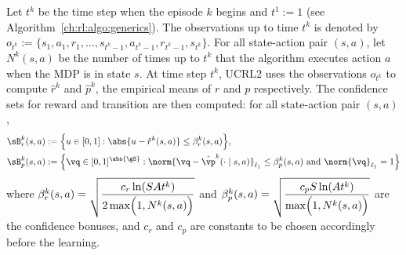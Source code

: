 Let $t^k$ be the time step when the episode $k$ begins and $t^1:=1$ (see Algorithm~\ref{ch:rl:algo:generics}).
The observations up to time $t^k$ is denoted by $o_{t^k}{:=}\{s_1,a_1,r_1,\dots,s_{t^k-1},a_{t^k-1},r_{t^k-1},s_{t^k}\}$.
For all state-action pair $(s,a)$, let $N^k(s,a)$ be the number of times up to $t^k$ that the algorithm executes action $a$ when the MDP is in state $s$.
At time step $t^k$, UCRL2 uses the observations $o_{t^k}$ to compute $\hat{r}^k$ and $\hat{p}^k$, the empirical means of $r$ and $p$ respectively.
The confidence sets for reward and transition are then computed: for all state-action pair $(s,a)$,
\begin{align*}
    \sB_r^k(s,a)&:=\Bigl\{u\in[0,1] : \abs{u-\hat{r}^k(s,a)}\le\beta^k_r(s,a)\Bigr\}, \\
    \sB_p^k(s,a)&:=\Bigl\{\vq\in[0,1]^{\abs{\gS}}: \norm{\vq-\hat{\vp}^k(\cdot\mid s,a)}_{\ell_1}\le \beta^k_p(s,a)
    \text{ and }\norm{\vq}_{\ell_1}=1\Bigr\}
\end{align*}
where $\beta_r^k(s,a)=\displaystyle\sqrt{\frac{c_r\ln(SAt^k)}{2\max\Bigl(1,N^k(s,a)\Bigr)}}$ and $\beta_p^k(s,a)=\displaystyle\sqrt{\frac{c_pS\ln(At^k)}{\max\Bigl(1,N^k(s,a)\Bigr)}}$ are the confidence bonuses, and $c_r$ and $c_p$ are constants to be chosen accordingly before the learning.

